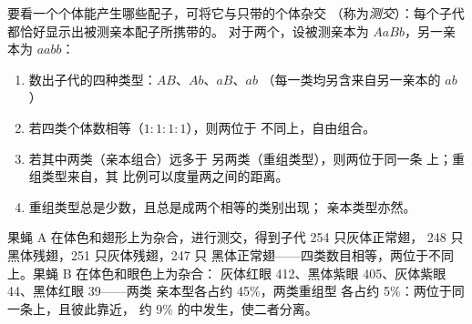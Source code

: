 \begin{method}[测交]\label{met:g12:meiosis-genetic-shuffling:testcross}
要看一个个体能产生哪些配子，可将它与只带的个体杂交
（称为\emph{测交}）：每个子代
都恰好显示出被测亲本配子所携带的。
对于两个，设被测亲本为 $AaBb$，另一亲本为 $aabb$：
\begin{enumerate}
  \item 数出子代的四种类型：$AB$、$Ab$、$aB$、$ab$
        （每一类均另含来自另一亲本的 $ab$）
  \item 若四类个体数相等（$1:1:1:1$），则两位于
        不同上，自由组合。
  \item 若其中两类（亲本组合）远多于
        另两类（重组类型），则两位于同一条
        上；重组类型来自，其
        比例可以度量两之间的距离。
  \item 重组类型总是少数，且总是成两个相等的类别出现；
        亲本类型亦然。
\end{enumerate}
\end{method}

\begin{example}[果蝇的两次杂交]\label{ex:g12:meiosis-genetic-shuffling:fly}
果蝇 A 在体色和翅形上为杂合，进行测交，得到子代 254 只灰体正常翅，
248 只黑体残翅，251 只灰体残翅，247 只
黑体正常翅——四类数目相等，两位于不同
上。果蝇 B 在体色和眼色上为杂合：
灰体红眼 412、黑体紫眼 405、灰体紫眼 44、黑体红眼 39——两类
亲本型各占约 45\%，两类重组型
各占约 5\%：两位于同一条上，且彼此靠近，
约 9\% 的中发生，使二者分离。
\end{example}

